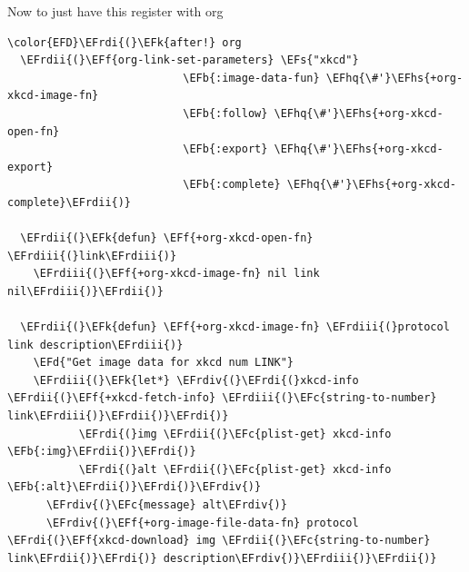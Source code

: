 \documentclass{scrartcl}
\newcommand{\EFk}[1]{\textcolor{EFk}{#1}} %
\newcommand{\EFd}[1]{\textcolor{EFd}{#1}} %
\newcommand{\EFs}[1]{\textcolor{EFs}{#1}} %
\newcommand{\EFb}[1]{\textcolor{EFb}{#1}} %
\newcommand{\EFc}[1]{\textcolor{EFc}{#1}} %
\newcommand{\EFf}[1]{\textcolor{EFf}{#1}} %
\newcommand{\EFhq}[1]{#1} %
\newcommand{\EFhs}[1]{#1} %
\newcommand{\EFrdi}[1]{#1} %
\newcommand{\EFrdii}[1]{#1} %
\newcommand{\EFrdiii}[1]{#1} %
\newcommand{\EFrdiv}[1]{#1} %
\begin{document}
Now to just have this register with org
\begin{Code}
\begin{Verbatim}[]
\color{EFD}\EFrdi{(}\EFk{after!} org
  \EFrdii{(}\EFf{org-link-set-parameters} \EFs{"xkcd"}
                           \EFb{:image-data-fun} \EFhq{\#'}\EFhs{+org-xkcd-image-fn}
                           \EFb{:follow} \EFhq{\#'}\EFhs{+org-xkcd-open-fn}
                           \EFb{:export} \EFhq{\#'}\EFhs{+org-xkcd-export}
                           \EFb{:complete} \EFhq{\#'}\EFhs{+org-xkcd-complete}\EFrdii{)}

  \EFrdii{(}\EFk{defun} \EFf{+org-xkcd-open-fn} \EFrdiii{(}link\EFrdiii{)}
    \EFrdiii{(}\EFf{+org-xkcd-image-fn} nil link nil\EFrdiii{)}\EFrdii{)}

  \EFrdii{(}\EFk{defun} \EFf{+org-xkcd-image-fn} \EFrdiii{(}protocol link description\EFrdiii{)}
    \EFd{"Get image data for xkcd num LINK"}
    \EFrdiii{(}\EFk{let*} \EFrdiv{(}\EFrdi{(}xkcd-info \EFrdii{(}\EFf{+xkcd-fetch-info} \EFrdiii{(}\EFc{string-to-number} link\EFrdiii{)}\EFrdii{)}\EFrdi{)}
           \EFrdi{(}img \EFrdii{(}\EFc{plist-get} xkcd-info \EFb{:img}\EFrdii{)}\EFrdi{)}
           \EFrdi{(}alt \EFrdii{(}\EFc{plist-get} xkcd-info \EFb{:alt}\EFrdii{)}\EFrdi{)}\EFrdiv{)}
      \EFrdiv{(}\EFc{message} alt\EFrdiv{)}
      \EFrdiv{(}\EFf{+org-image-file-data-fn} protocol \EFrdi{(}\EFf{xkcd-download} img \EFrdii{(}\EFc{string-to-number} link\EFrdii{)}\EFrdi{)} description\EFrdiv{)}\EFrdiii{)}\EFrdii{)}


\end{Verbatim}
\end{Code}
\end{document}

